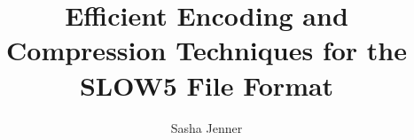 \documentclass[sigconf]{acmart}
\begin{document}
\title{Efficient Encoding and Compression Techniques for the SLOW5 File Format}
\author{Sasha Jenner}



\maketitle

\tableofcontents
\listoffigures
\listoftables












\newpage
\printnomenclature

\clearpage
\appendix

\end{document}
